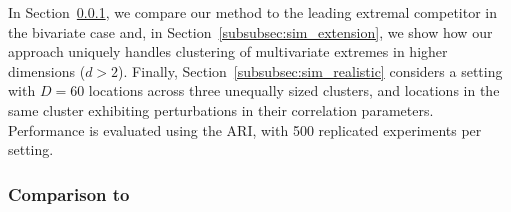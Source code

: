 \documentclass[12pt,compact]{article}
\newcommand{\rhou}[1]{\rho_{\text{#1}}}
\begin{document}
In Section~\ref{subsubsec:sim_competing_methods}, we compare our method to the leading extremal competitor in the bivariate case \citep{Vignotto2021} and, in Section~\ref{subsubsec:sim_extension}, we show how our approach uniquely handles clustering of multivariate extremes in higher dimensions ($d > 2$).
Finally, Section~\ref{subsubsec:sim_realistic} considers a setting with $D = 60$ locations across three unequally sized clusters, and locations in the same cluster exhibiting perturbations in their correlation parameters.
Performance is evaluated using the ARI, with 500 replicated experiments per setting.

\subsubsection{Comparison to \citet{Vignotto2021}}
\label{subsubsec:sim_competing_methods}
\end{document}
